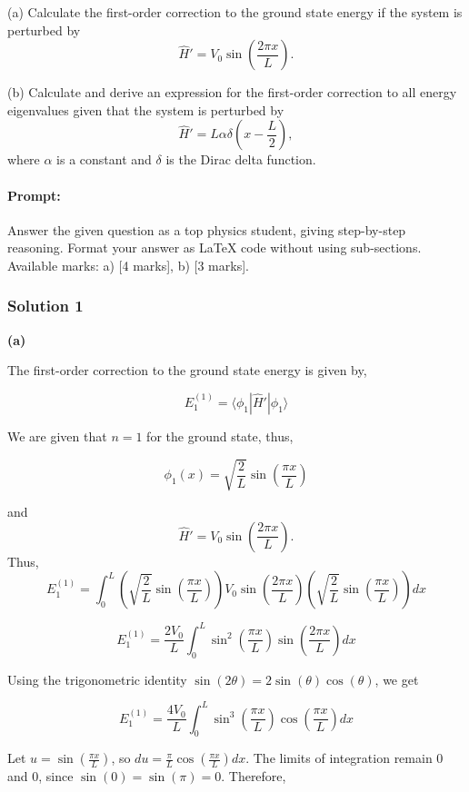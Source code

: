 \documentclass{article}
\begin{document}
(a) Calculate the first-order correction to the ground state energy if the system is perturbed by
\[
\hat{H}' = V_0 \sin\left(\frac{2\pi x}{L}\right).
\]

(b) Calculate and derive an expression for the first-order correction to all energy eigenvalues given that the system is perturbed by
\[
\hat{H}' = L \alpha \delta\left(x - \frac{L}{2}\right),
\]
where \(\alpha\) is a constant and \(\delta\) is the Dirac delta function.

\paragraph{Prompt: \\} 
Answer the given question as a top physics student, giving step-by-step reasoning. Format your answer as LaTeX code without using sub-sections. Available marks: a) [4 marks], b) [3 marks].

\subsubsection{Solution 1}

\textbf{(a)}

The first-order correction to the ground state energy is given by,

\[
E_1^{(1)} = \langle \phi_1 | \hat{H}' | \phi_1 \rangle
\]

We are given that \(n=1\) for the ground state, thus,

\[
\phi_1(x) = \sqrt{\frac{2}{L}} \sin\left(\frac{\pi x}{L}\right)
\]

and
\[
\hat{H}' = V_0 \sin\left(\frac{2\pi x}{L}\right).
\]
Thus,
\[
E_1^{(1)} = \int_0^L \left(\sqrt{\frac{2}{L}} \sin\left(\frac{\pi x}{L}\right)\right) V_0 \sin\left(\frac{2\pi x}{L}\right) \left(\sqrt{\frac{2}{L}} \sin\left(\frac{\pi x}{L}\right)\right) dx
\]

\[
E_1^{(1)} = \frac{2V_0}{L} \int_0^L \sin^2\left(\frac{\pi x}{L}\right) \sin\left(\frac{2\pi x}{L}\right) dx
\]

Using the trigonometric identity \(\sin(2\theta) = 2\sin(\theta)\cos(\theta)\), we get

\[
E_1^{(1)} = \frac{4V_0}{L} \int_0^L \sin^3\left(\frac{\pi x}{L}\right) \cos\left(\frac{\pi x}{L}\right) dx
\]

Let \(u = \sin\left(\frac{\pi x}{L}\right)\), so \(du = \frac{\pi}{L} \cos\left(\frac{\pi x}{L}\right) dx\).
The limits of integration remain 0 and 0, since \(\sin(0) = \sin(\pi) = 0\).
Therefore,
\end{document}
